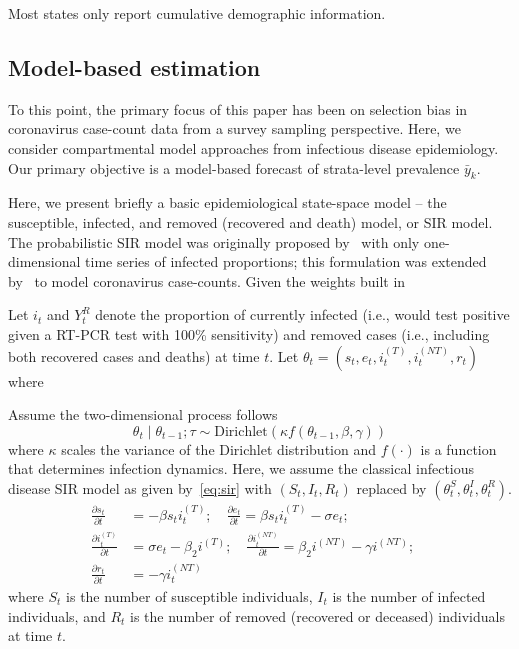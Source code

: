 \documentclass[11pt]{amsart}
\begin{document}
\begin{rmk}
Most states only report cumulative demographic information.
\end{rmk}

\subsection{Model-based estimation}
\label{section:modelbased}

To this point, the primary focus of this paper has been on selection bias in coronavirus case-count data from a survey sampling perspective.  Here, we consider compartmental model approaches from infectious disease epidemiology.  Our primary objective is a model-based forecast of strata-level prevalence $\bar y_k$.

Here, we present briefly a basic epidemiological state-space model -- the susceptible, infected, and removed (recovered and death) model, or SIR model. The probabilistic SIR model was originally proposed by~\cite{Osthus2017} with only one-dimensional time series of infected proportions; this formulation was extended by~\cite{Song2020} to model coronavirus case-counts. Given the weights built in

Let $i_t$ and $Y_t^R$ denote the proportion of currently infected (i.e., would test positive given a RT-PCR test with 100\% sensitivity) and removed cases (i.e., including both recovered cases and deaths) at time $t$.  Let $\theta_t = (s_t, e_t, i_t^{(T)}, i_t^{(NT)}, r_t)$ where

Assume the two-dimensional process follows
$$
\theta_t \mid \theta_{t-1}; \tau \sim \text{Dirichlet} \left(\kappa f(\theta_{t-1}, \beta, \gamma) \right)
$$
where $\kappa$ scales the variance of the Dirichlet distribution and $f(\cdot)$ is a function that determines infection dynamics.  Here, we assume the classical infectious disease SIR model as given by~\eqref{eq:sir} with $(S_t,I_t, R_t)$ replaced by $(\theta_t^S, \theta_t^I, \theta_t^R)$.  \cite{Song2020}
\begin{align*}
\frac{\partial s_t}{\partial t} &= - \beta s_t i^{(T)}_t; \quad \frac{\partial e_t}{\partial t} = \beta s_t i^{(T)}_t - \sigma e_t; \quad \\
\frac{\partial i^{(T)}_t}{\partial t} &= \sigma e_t - \beta_2 i^{(T)}; \quad
\frac{\partial i^{(NT)}_t}{\partial t} = \beta_2 i^{(NT)}  - \gamma i^{(NT)}; \quad \\
\frac{\partial r_t}{\partial t} &= - \gamma i^{(NT)}_t
\end{align*}
where $S_t$ is the number of susceptible individuals, $I_t$ is the number of infected individuals, and $R_t$ is the number of removed (recovered or deceased) individuals at time $t$.
\end{document}
